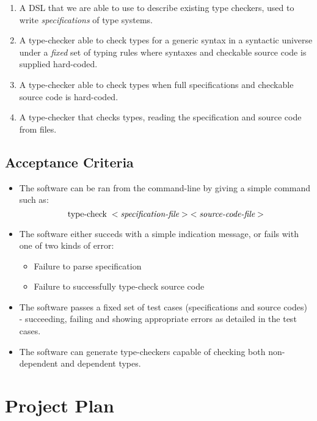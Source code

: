 \documentclass{ProgressReport}[2020/09/15]
\begin{document}
          \begin{enumerate}
          \item A DSL that we are able to use to describe existing
            type checkers, used to write \emph{specifications} of type systems.
          \item A type-checker able to check types for a generic syntax
            in a syntactic universe under a \emph{fixed} set of typing rules
            where syntaxes and checkable source code is supplied hard-coded.
          \item A type-checker able to check types when full specifications
            and checkable source code is hard-coded.
          \item A type-checker  that checks types, reading
            the specification and source code from files.
          \end{enumerate}
          
          \section{Acceptance Criteria}

          \begin{itemize}
          \item The software can be ran from the command-line by
            giving a simple command such as: $$\mbox{type-check} \;
            <\emph{specification-file}> \;
            <\emph{source-code-file}>$$
          \item The software either succeds with a simple indication
            message, or fails with one of two kinds of error:
            \begin{itemize}
            \item Failure to parse specification
            \item Failure to successfully type-check source code
            \end{itemize}
          \item The software passes a fixed set of test cases (specifications and
            source codes) - succeeding, failing and showing
            appropriate errors as detailed in the test cases.
          \item The software can generate type-checkers capable of
            checking both non-dependent and dependent types.
          \end{itemize}
        
        \chapter{Project Plan}
\end{document}
